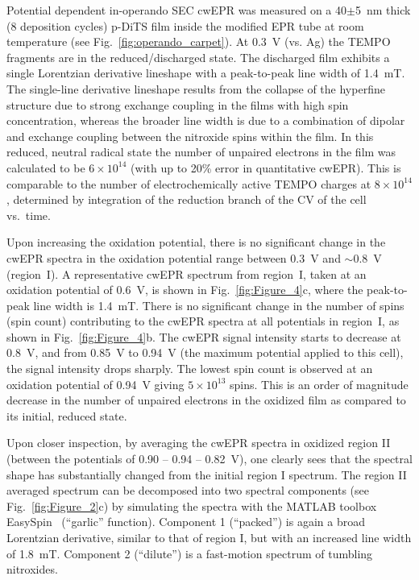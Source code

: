 Potential dependent in-operando SEC cwEPR was measured on a 40$\pm$5~nm thick (8 deposition cycles) p-DiTS film inside the modified EPR tube at room temperature (see Fig.~\ref{fig:operando_carpet}). At 0.3~V (vs. Ag) the TEMPO fragments are in the reduced/discharged state. The discharged film exhibits a single Lorentzian derivative lineshape with a peak-to-peak line width of 1.4~mT. The single-line derivative lineshape results from the collapse of the hyperfine structure due to strong exchange coupling in the films with high spin concentration, whereas the broader line width is due to a combination of dipolar and exchange coupling between the nitroxide spins within the film. In this reduced, neutral radical state the number of unpaired electrons in the film was calculated to be $6\times10^{14}$ (with up to 20\% error in quantitative cwEPR). This is comparable to the number of electrochemically active TEMPO charges at $8\times10^{14}$, determined by integration of the reduction branch of the CV of the cell vs.\ time.
\par
Upon increasing the oxidation potential, there is no significant change in the cwEPR spectra in the oxidation potential range between 0.3~V and $\sim$0.8~V (region~I). A representative cwEPR spectrum from region~I, taken at an oxidation potential of 0.6~V, is shown in Fig.~\ref{fig:Figure_4}c, where the peak-to-peak line width is 1.4~mT. There is no significant change in the number of spins (spin count) contributing to the cwEPR spectra at all potentials in region~I, as shown in Fig.~\ref{fig:Figure_4}b. The cwEPR signal intensity starts to decrease at 0.8~V, and from 0.85~V to 0.94~V (the maximum potential applied to this cell), the signal intensity drops sharply. The lowest spin count is observed at an oxidation potential of 0.94~V giving $5\times10^{13}$ spins. This is an order of magnitude decrease in the number of unpaired electrons in the oxidized film as compared to its initial, reduced state.


\par
Upon closer inspection, by averaging the cwEPR spectra in oxidized region II (between the potentials of 0.90 -- 0.94 -- 0.82~V), one clearly sees that the spectral shape has substantially changed from the initial region I spectrum. The region II averaged spectrum can be decomposed into two spectral components (see Fig.~\ref{fig:Figure_2}c) by simulating the spectra with the MATLAB toolbox EasySpin~\cite{Stoll2006} (``garlic'' function). Component 1 (``packed'') is again a broad Lorentzian derivative, similar to that of region I, but with an increased line width of 1.8~mT. Component 2 (``dilute'') is a fast-motion spectrum of tumbling nitroxides.

